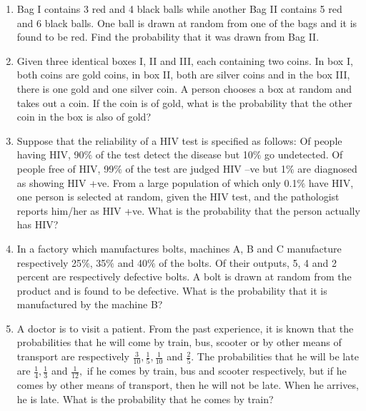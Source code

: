 \begin{enumerate}[label=\thesection.\arabic*.,ref=\thesection.\theenumi]
\item Bag I contains 3 red and 4 black balls while another Bag II contains 5 red and 6 black balls. One ball is drawn at random from one of the bags and it is found to be red. Find the probability that it was drawn from Bag II.\\
\solution


\item Given three identical boxes I, II and III, each containing two coins. In box I, both coins are gold coins, in box II, both are silver coins and in the box III, there is one gold and one silver coin. A person chooses a box at random and takes out a coin. If the coin is of gold, what is the probability that the other coin in the box is also of gold?\\
\solution


\item Suppose that the reliability of a HIV test is specified as follows: Of people having HIV, 90$\%$ of the test detect the disease but 10$\%$ go undetected. Of people free of HIV, 99$\%$ of the test are judged HIV –ve but 1$\%$ are diagnosed as showing HIV +ve. From a large population of which only 0.1$\%$ have HIV, one person is selected at random, given the HIV test, and the pathologist reports him/her as HIV +ve. What is the probability that the person actually has HIV?\\
\solution


\item In a factory which manufactures bolts, machines A, B and C manufacture respectively 25$\%$, 35$\%$ and 40$\%$ of the bolts. Of their outputs, 5, 4 and 2 percent are respectively defective bolts. A bolt is drawn at random from the product and is found to be defective. What is the probability that it is manufactured by the machine B?\\
\solution


\item A doctor is to visit a patient. From the past experience, it is known that the probabilities that he will come by train, bus, scooter or by other means of transport are respectively $\frac{3}{10},\frac{1}{5},\frac{1}{10}$ and $\frac{2}{5}.$ The probabilities that he will be late are $\frac{1}{4},\frac{1}{3}$ and $\frac{1}{12},$ if he comes by train, bus and scooter respectively, but if he comes by other means of transport, then he will not be late. When he arrives, he is late. What is the probability that he comes by train?\\
\solution



\end{enumerate}
